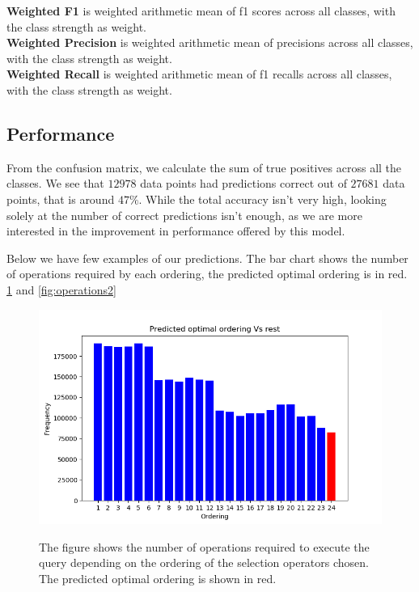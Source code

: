 \par \textbf{Weighted F1} is weighted arithmetic mean of f1 scores across all classes, with the class strength as weight.\\
\textbf{Weighted Precision} is weighted arithmetic mean of precisions across all classes, with the class strength as weight.\\
\textbf{Weighted Recall} is weighted arithmetic mean of f1 recalls across all classes, with the class strength as weight.\\



\subsection{Performance}
From the confusion matrix, we calculate the sum of true positives across all the classes. We see that $12978$ data points had predictions correct out of $27681$ data points, that is around $47\%$. While the total accuracy isn't very high, looking solely at the number of correct predictions isn't enough, as we are more interested in the improvement in performance offered by this model.
\par Below we have few examples of our predictions. The bar chart shows the number of operations required by each ordering, the predicted optimal ordering is in red. \ref{fig:operations1} and \ref{fig:operations2}

\begin{figure}
\centering
\includegraphics[scale=0.8]{operations1.png}\\
\caption{The figure shows the number of operations required to execute the query depending on the ordering of the selection operators chosen. The predicted optimal ordering is shown in red.}
\label{fig:operations1}
\end{figure}

